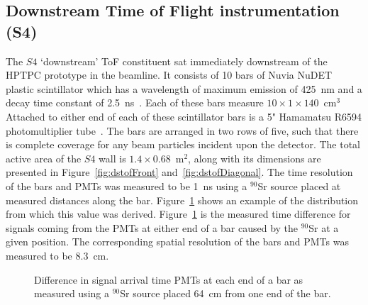 \subsection{Downstream Time of Flight instrumentation (S4)}
\label{subsec:s4Exp}
The $\mathit{S4}$ `downstream' ToF constituent sat immediately downstream of the HPTPC prototype in the beamline.
It consists of 10 bars of Nuvia NuDET plastic scintillator which has a wavelength of maximum emission of 425~nm and a decay time constant of 2.5~ns~\cite{Nuvia}.
Each of these bars measure $10 \times 1 \times 140$~cm$^3$
Attached to either end of each of these scintillator bars is a 5" Hamamatsu R6594 photomultiplier tube~\cite{Hamamatsu}.
The bars are arranged in two rows of five, such that there is complete coverage for any beam particles incident upon the detector.
The total active area of the $\mathit{S4}$ wall is $1.4 \times 0.68$~m$^2$, along with its dimensions are presented in Figure~\ref{fig:dstofFront} and~\ref{fig:dstofDiagonal}.
The time resolution of the bars and PMTs was measured to be 1~ns using a $^{90}$Sr source placed at measured distances along the bar.
Figure~\ref{fig:s4Res} shows an example of the distribution from which this value was derived.
Figure~\ref{fig:s4Res} is the measured time difference for signals coming from the PMTs at either end of a bar caused by the $^{90}$Sr at a given position.
The corresponding spatial resolution of the bars and PMTs was measured to be 8.3~cm.

\begin{figure}[h]
	\begin{adjustbox}{max totalsize={.8\textwidth}{.5\textheight},center}
		
	\end{adjustbox}
	\caption{Difference in signal arrival time PMTs at each end of a bar as measured using a $^{90}$Sr source placed 64~cm from one end of the bar.}
	\label{fig:s4Res}	
\end{figure}


